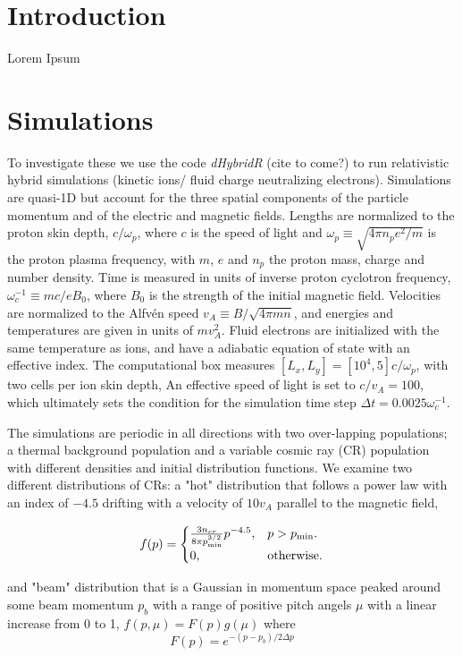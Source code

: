 \documentclass[twocolumn]{aastex631}
\newcommand\pp{p_{\rm min}}
\begin{document}
\section{Introduction} \label{sec:intro}
Lorem Ipsum

\section{Simulations} \label{sec:sims}
To investigate these we use the code \emph{dHybridR} (cite to come?) to run relativistic hybrid simulations (kinetic ions/ fluid charge neutralizing electrons).
Simulations are quasi-1D but account for the three spatial components of the particle momentum and of the electric and magnetic fields. 
 Lengths are normalized to the proton skin depth, $c/\omega_p$, where $c$ is the speed of light and $\omega_p\equiv \sqrt{4\pi n_p e^2/m}$ is the proton plasma frequency, with $m$, $e$ and $n_p$ the proton mass, charge and number density.
Time is measured in units of inverse proton cyclotron frequency, $\omega_c^{-1}\equiv mc/eB_0$, where $B_0$ is the strength of the initial magnetic field.
Velocities are normalized to the Alfv\'en speed $v_A\equiv B/\sqrt{4\pi m n}$, and energies and temperatures are given in units of $mv_A^2$.
Fluid electrons are initialized with the same temperature as ions, and have a adiabatic equation of state with an effective index.
The computational box measures $[L_x,L_y]=[10^4, 5] c/\omega_p$, with two cells per ion skin depth, An effective speed of light is set to $c/v_A = 100$, which ultimately sets the condition for the simulation time step $\Delta t=0.0025 \omega_c^{-1}$.

The simulations are periodic in all directions with two over-lapping populations; a thermal background population and a variable cosmic ray (CR) population with different densities and initial distribution functions.
We examine two different distributions of CRs: a "hot" distribution that follows a power law with an index of $-4.5$ drifting with a velocity of $10v_A$ parallel to the magnetic field,

\begin{equation}
f(p)=\begin{cases}
    \frac{3n_{cr}}{8\pi \pp^{3/2}}p^{-4.5}, & p > \pp.\\
    0, & \text{otherwise}.
\end{cases}
\end{equation} 

and "beam" distribution that is a Gaussian in momentum space peaked around some beam momentum $p_b$ with a range of positive pitch angels $\mu$ with a linear increase from 0 to 1, $f(p,\mu) = F(p)g(\mu)$ where
\begin{equation}
F(p) = e^{-(p - p_b)/2\Delta p}
\end{equation}
\end{document}
